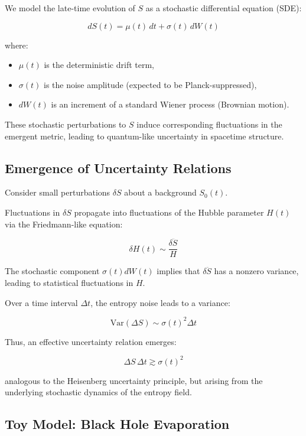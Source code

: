 \documentclass{article}
\begin{document}
We model the late-time evolution of $S$ as a stochastic differential equation (SDE):

\begin{equation}
dS(t) = \mu(t) \, dt + \sigma(t) \, dW(t)
\end{equation}

where:
\begin{itemize}
    \item $\mu(t)$ is the deterministic drift term,
    \item $\sigma(t)$ is the noise amplitude (expected to be Planck-suppressed),
    \item $dW(t)$ is an increment of a standard Wiener process (Brownian motion).
\end{itemize}

These stochastic perturbations to $S$ induce corresponding fluctuations in the emergent metric, leading to quantum-like uncertainty in spacetime structure.

\subsection{Emergence of Uncertainty Relations}

Consider small perturbations $\delta S$ about a background $S_0(t)$.

Fluctuations in $\delta S$ propagate into fluctuations of the Hubble parameter $H(t)$ via the Friedmann-like equation:

\[
\delta H(t) \sim \frac{\delta \ddot{S}}{H}
\]

The stochastic component $\sigma(t) dW(t)$ implies that $\delta \ddot{S}$ has a nonzero variance, leading to statistical fluctuations in $H$.

Over a time interval $\Delta t$, the entropy noise leads to a variance:

\[
\text{Var}(\Delta S) \sim \sigma(t)^2 \Delta t
\]

Thus, an effective uncertainty relation emerges:

\begin{equation}
\Delta S \, \Delta t \gtrsim \sigma(t)^2
\label{eq:EntropyUncertainty}
\end{equation}

analogous to the Heisenberg uncertainty principle, but arising from the underlying stochastic dynamics of the entropy field.

\subsection{Toy Model: Black Hole Evaporation}
\end{document}
